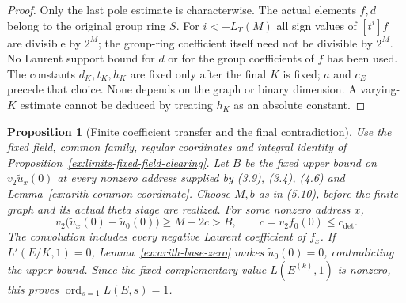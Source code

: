 \documentclass[11pt]{article}
\newtheorem{proposition}[theorem]{Proposition}
\theoremstyle{definition}
\theoremstyle{remark}
\begin{document}
\begin{proof}
Only the last pole estimate is characterwise.  The actual elements
$f,d$ belong to the original group ring $S$.  For $i<-L_T(M)$ all
sign values of $[t^i]f$ are divisible by $2^M$; the group-ring
coefficient itself need not be divisible by $2^M$.  No Laurent
support bound for $d$ or for the group coefficients of $f$ has been
used.  The constants $d_K,t_K,h_K$ are fixed only after the final
$K$ is fixed; $a$ and $c_E$ precede that choice.  None depends on
the graph or binary dimension.  A varying-$K$ estimate cannot be
deduced by treating $h_K$ as an absolute constant.
\end{proof}

\begin{proposition}[Finite coefficient transfer and the final contradiction]\label{ex:limits-coefficient-transfer}
Use the fixed field, common family, regular coordinates and
integral identity of Proposition~\ref{ex:limits-fixed-field-clearing}.
Let $B$ be the fixed upper bound on
$v_2\widetilde u_x(0)$ at every nonzero address supplied by
(3.9), (3.4), (4.6) and Lemma~\ref{ex:arith-common-coordinate}.
Choose $M,b$ as in (5.10), before the finite graph and its actual
theta stage are realized. For some nonzero address $x$,
\[
 v_2\bigl(\widetilde u_x(0)-\widetilde u_0(0)\bigr)
 \geq M-2c>B,\qquad c=v_2f_0(0)\leq c_{\det}.
\]
The convolution includes every negative Laurent coefficient
of $f_x$. If $L'(E/K,1)=0$, Lemma~\ref{ex:arith-base-zero}
makes $\widetilde u_0(0)=0$, contradicting the upper bound.
Since the fixed complementary value $L(E^{(k)},1)$ is nonzero,
this proves $\operatorname{ord}_{s=1}L(E,s)=1$.
\end{proposition}
\end{document}
